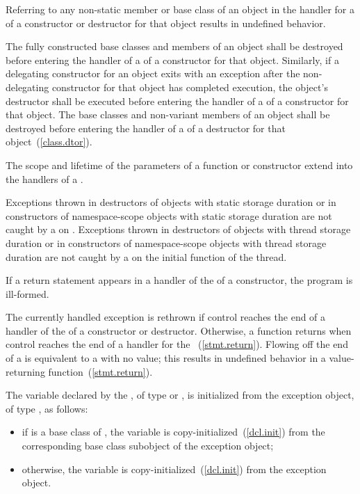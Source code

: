 \pnum
Referring to any non-static member or base class of an object
in the handler for a
of a constructor or destructor for that object results in undefined behavior.

\pnum
The fully constructed base classes and members of an object shall
be destroyed before entering the handler of a
of a constructor for that object.
Similarly, if a delegating constructor for an object exits
with an exception after the non-delegating constructor for that object
has completed execution, the object's destructor shall be executed before
entering the handler of a  of a
constructor for that object. The base classes and non-variant members of an object shall be destroyed before entering the handler of a  of a destructor for that object~(\ref{class.dtor}).

\pnum
The scope and lifetime of the parameters of a function or constructor
extend into the handlers of a
.

\pnum
Exceptions thrown in destructors of objects with static storage duration or in
constructors of namespace-scope objects with static storage duration are not caught by a
on
. Exceptions thrown in destructors of objects with thread storage duration or in constructors of namespace-scope objects with thread storage duration are not caught by a
on the initial function of the thread.

\pnum
If a return statement appears in a handler of the
of a
constructor, the program is ill-formed.

\pnum
The currently handled exception
is rethrown if control reaches the end of a handler of the
of a constructor or destructor.
Otherwise, a
function returns when control reaches the end of a handler for
the
~(\ref{stmt.return}).
Flowing off the end of a
is equivalent to a
with no value;
this results in undefined behavior in a value-returning function~(\ref{stmt.return}).

\pnum
The variable declared by the , of type
\cv{}  or \cv{} , is initialized from the exception object,
of type , as follows:

\begin{itemize}
\item
if  is a base class of , the variable is
copy-initialized~(\ref{dcl.init}) from the corresponding base class subobject
of the exception object;
\item otherwise, the variable is copy-initialized~(\ref{dcl.init})
from the exception object.
\end{itemize}

